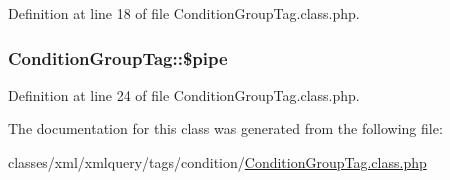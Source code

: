 Definition at line 18 of file Condition\-Group\-Tag.\-class.\-php.

\hypertarget{classConditionGroupTag_af3040978080a9af0e9f8760eb05cc58b}{
\subsubsection[{\$pipe}]{\setlength{\rightskip}{0pt plus 5cm}Condition\-Group\-Tag\-::\$pipe}}\label{classConditionGroupTag_af3040978080a9af0e9f8760eb05cc58b}


Definition at line 24 of file Condition\-Group\-Tag.\-class.\-php.



The documentation for this class was generated from the following file\-:\begin{DoxyCompactItemize}
\item 
classes/xml/xmlquery/tags/condition/\hyperlink{ConditionGroupTag_8class_8php}{Condition\-Group\-Tag.\-class.\-php}\end{DoxyCompactItemize}
